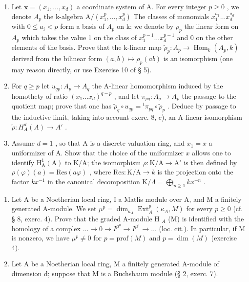 \begin{enumerate}
\def\labelenumi{\alph{enumi})}
\item
  Let \(\mathbf{x} = (x_{1}, \ldots, x_{d})\) a coordinate system of A. For every integer \(p \geqslant 0\) , we denote \(A_{p}\) the k-algebra \(\mathrm{A}/(x_{1}^{p}, \ldots, x_{d}^{p})\) The classes of monomials \(x_{1}^{a_{1}} \ldots x_{d}^{a_{d}}\) with \(0 \leqslant a_{i} < p\) form a basis of \(A_{p}\) on k; we denote by \(\rho_{p}\) the linear form on \(A_{p}\) which takes the value 1 on the class of \(x_{1}^{p-1} \ldots x_{d}^{p-1}\) and 0 on the other elements of the basis. Prove that the k-linear map \(\tilde{\rho}_{p}: A_{p} \to \operatorname{Hom}_{k}(A_{p}, k)\) derived from the bilinear form \((a, b) \mapsto \rho_{p}(ab)\) is an isomorphism (one may reason directly, or use Exercise 10 of § 5).
\item
  For \(q \geqslant p\) let \(u_{qp}: A_p \to A_q\) the A-linear homomorphism induced by the homothety of ratio \((x_1 \ldots x_d)^{q-p}\) , and let \(\pi_{pq}: A_q \to A_p\) the passage-to-the-quotient map; prove that one has \(\tilde{\rho}_q \circ u_{qp} = {}^t \pi_{pq} \circ \tilde{\rho}_p\) . Deduce by passage to the inductive limit, taking into account exerc. 8, c), an A-linear isomorphism \(\tilde{\rho}: H_A^d(A) \to A'\) .
\item
  Assume \(d=1\) , so that A is a discrete valuation ring, and \(x_{1}=x\) a uniformizer of A. Show that the choice of the uniformizer \(x\) allows one to identify \(\mathrm{H}_{\mathrm{A}}^{1}(\mathrm{A})\) to K/A; the isomorphism \(\rho:\mathrm{K}/\mathrm{A}\to\mathrm{A}'\) is then defined by \(\rho(\varphi)(a)=\mathrm{Res}(a\varphi)\) , where \(\mathrm{Res}:\mathrm{K}/\mathrm{A}\to k\) is the projection onto the factor \(k x^{-1}\) in the canonical decomposition \(\mathrm{K}/\Lambda=\bigoplus_{n\geqslant 1}k x^{-n}\) .
\end{enumerate}

\begin{enumerate}
\def\labelenumi{\arabic{enumi})}
\setcounter{enumi}{10}
\item
  Let A be a Noetherian local ring, I a Matlis module over A, and M a finitely generated A-module. We set \(\mu^{p} = \dim_{\kappa_{A}} \operatorname{Ext}_{A}^{p}(\kappa_{A}, M)\) for every \(p \geqslant 0\) (cf. § 8, exerc. 4). Prove that the graded A-module H \(_{A}\) (M) is identified with the homology of a complex \(\ldots \to 0 \to I^{\mu^{0}} \to I^{\mu^{1}} \to \ldots\) (loc. cit.). In particular, if M is nonzero, we have \(\mu^{p} \neq 0\) for \(p = \text{prof}(M)\) and \(p = \dim(M)\) (exercise 4).
\item
  Let A be a Noetherian local ring, M a finitely generated A-module of dimension d; suppose that M is a Buchsbaum module (§ 2, exerc. 7).
\end{enumerate}

